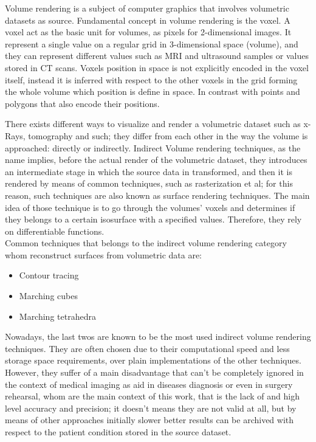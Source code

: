 \documentclass[10pt,a4paper]{article}
\begin{document}
Volume rendering is a subject of computer graphics that involves volumetric datasets as source. Fundamental concept in volume rendering is the voxel. 
A voxel act as the basic unit for volumes, as pixels for 2-dimensional images.
It represent a single value on a regular grid in 3-dimensional space (volume), and they can represent different values such as MRI and ultrasound samples or values stored in CT scans. Voxels position in space is not explicitly encoded in the voxel itself, instead it is inferred with respect to the other voxels in the grid forming the whole volume which position is define in space. In contrast with points and polygons that also encode their positions. %

There exists different ways to visualize and render a volumetric dataset such as x-Rays, tomography and such; they differ from each other in the way the volume is approached: directly or indirectly.
Indirect Volume rendering techniques, as the name implies, before the actual render of the volumetric dataset, they introduces an intermediate stage in which the source data in transformed, and then it is rendered by means of common techniques, such as rasterization et al; for this reason, such techniques are also known as surface rendering techniques.
The main idea of those technique is to go through the volumes' voxels and determines if they belongs to a certain isosurface with a specified values. Therefore, they rely on differentiable functions.\\
Common techniques that belongs to the indirect volume rendering category whom reconstruct surfaces from volumetric data are:
\begin{itemize}
\item Contour tracing
\item Marching cubes
\item Marching tetrahedra
\end{itemize}

Nowadays, the last twos are known to be the most used indirect volume rendering techniques.
They are often chosen due to their computational speed %
and less storage space requirements, over plain implementations of the other techniques. However, they suffer of a main disadvantage that can't be completely ignored in the context of medical imaging as aid in diseases diagnosis or even in surgery rehearsal, whom are the main context of this work, that is the lack of and high level accuracy and precision; it doesn't means they are not valid at all, but by means of other approaches initially slower better results can be archived with respect to the patient condition stored in the source dataset.  
\end{document}
